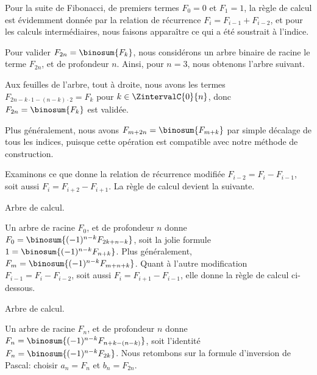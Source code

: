 Pour la suite de Fibonacci, de premiers termes $F_0 = 0$ et $F_1 = 1$, la règle de calcul est évidemment donnée par la relation de récurrence $F_{i} = F_{i-1} + F_{i-2}$,
et pour les calculs intermédiaires, nous faisons apparaître ce qui a été soustrait à l'indice.

%
            {\intertree}{}

Pour valider $F_{2n} = \binosum{F_k}$, nous considérons un arbre binaire de racine le terme $F_{2n}$, et de profondeur $n$.
Ainsi, pour $n=3$, nous obtenons l'arbre suivant.


Aux feuilles de l'arbre, tout à droite, nous avons les termes 
$F_{2n - k\cdot1 - (n-k)\cdot2} = F_k$
pour $k \in \ZintervalC{0}{n}$,
donc
$F_{2n} = \binosum{F_k}$ est validée.


\begin{remark}
	Plus généralement, nous avons
	$F_{m+2n} = \binosum{F_{m+k}}$
	par simple décalage de tous les indices,
	puisque cette opération est compatible avec notre méthode de construction.
\end{remark}




\begin{remark}
	Examinons ce que donne la relation de récurrence modifiée $F_{i-2} = F_{i} - F_{i-1}$, soit aussi $F_i = F_{i+2} - F_{i+1}$.
	La règle de calcul devient la suivante.

    \begin{center}
    	\itshape\centering
        
    
        Arbre de calcul.
    \end{center}
    
    Un arbre de racine $F_0$, et de profondeur $n$ donne
    $F_{0} = \binosum{(-1)^{n-k} F_{2k + n - k}}$,
    soit la jolie formule
    $1 = \binosum{(-1)^{n-k} F_{n + k}}$.
    Plus généralement,
    $F_{m} = \binosum{(-1)^{n-k} F_{m + n + k}}$.
    Quant à l'autre modification $F_{i-1} = F_{i} - F_{i-2}$, soit aussi $F_i = F_{i+1} - F_{i-1}$, elle donne la règle de calcul ci-dessous.

    \begin{center}
    	\itshape\centering
        
    
        Arbre de calcul.
    \end{center}
    
    Un arbre de racine $F_n$, et de profondeur $n$ donne
    $F_{n} = \binosum{(-1)^{n-k} F_{n + k - (n - k)}}$,
    soit l'identité
    $F_{n} = \binosum{(-1)^{n-k} F_{2 k}}$.
    Nous retombons sur la formule d'inversion de Pascal:
    choisir $a_n = F_n$ et $b_n = F_{2n}$. 
\end{remark}


